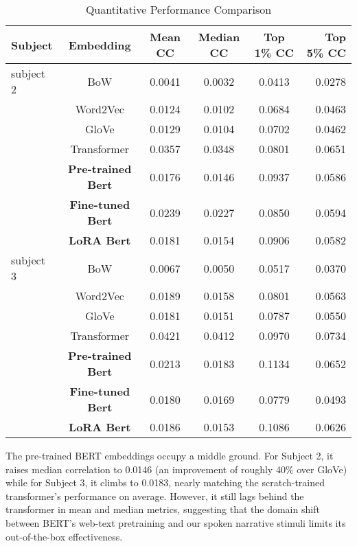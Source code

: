 \documentclass{article}
\begin{document}
\begin{table}
\centering
\begin{tabular}{lccccr}
\hline
\textbf{Subject} & \textbf{Embedding} & \textbf{Mean CC} & \textbf{Median CC} & \textbf{Top 1\% CC} & \textbf{Top 5\% CC} \\
\hline
subject 2 & BoW & 0.0041 & 0.0032 & 0.0413 & 0.0278 \\
 & Word2Vec & 0.0124 & 0.0102 & 0.0684 & 0.0463 \\
 & GloVe & 0.0129 & 0.0104 & 0.0702 & 0.0462 \\
 & Transformer & 0.0357 & 0.0348 & 0.0801 & 0.0651 \\
 & \textbf{Pre-trained Bert} & 0.0176 & 0.0146 & 0.0937 & 0.0586 \\
 & \textbf{Fine-tuned Bert} & 0.0239 & 0.0227 & 0.0850 & 0.0594 \\
 & \textbf{LoRA Bert} & 0.0181 & 0.0154 & 0.0906 & 0.0582 \\
subject 3 & BoW & 0.0067 & 0.0050 & 0.0517 & 0.0370 \\
 & Word2Vec & 0.0189 & 0.0158 & 0.0801 & 0.0563 \\
 & GloVe & 0.0181 & 0.0151 & 0.0787 & 0.0550 \\
 & Transformer & 0.0421 & 0.0412 & 0.0970 & 0.0734 \\
 & \textbf{Pre-trained Bert} & 0.0213 & 0.0183 & 0.1134 & 0.0652 \\
 & \textbf{Fine-tuned Bert} & 0.0180 & 0.0169 & 0.0779 & 0.0493 \\
 & \textbf{LoRA Bert} & 0.0186 & 0.0153 & 0.1086 & 0.0626 \\
\hline
\end{tabular}
\caption{\label{tab:compare_subject2}Quantitative Performance Comparison}
\end{table}

The pre-trained BERT embeddings occupy a middle ground. For Subject 2, it raises median correlation to 0.0146 (an improvement of roughly 40\% over GloVe) while for Subject 3, it climbs to 0.0183, nearly matching the scratch‐trained transformer’s performance on average. However, it still lags behind the transformer in mean and median metrics, suggesting that the domain shift between BERT’s web-text pretraining and our spoken narrative stimuli limits its out-of-the-box effectiveness.
\end{document}
